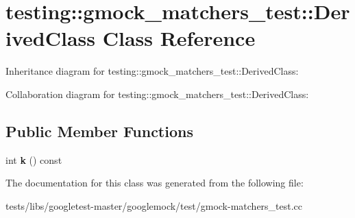 \hypertarget{classtesting_1_1gmock__matchers__test_1_1DerivedClass}{}\section{testing\+:\+:gmock\+\_\+matchers\+\_\+test\+:\+:Derived\+Class Class Reference}
\label{classtesting_1_1gmock__matchers__test_1_1DerivedClass}


Inheritance diagram for testing\+:\+:gmock\+\_\+matchers\+\_\+test\+:\+:Derived\+Class\+:


Collaboration diagram for testing\+:\+:gmock\+\_\+matchers\+\_\+test\+:\+:Derived\+Class\+:
\subsection*{Public Member Functions}
\begin{DoxyCompactItemize}
\item 
\mbox{\label{classtesting_1_1gmock__matchers__test_1_1DerivedClass_a6f8638915c84cb14365e337d99857847}} 
int {\bfseries k} () const
\end{DoxyCompactItemize}


The documentation for this class was generated from the following file\+:\begin{DoxyCompactItemize}
\item 
tests/libs/googletest-\/master/googlemock/test/gmock-\/matchers\+\_\+test.\+cc\end{DoxyCompactItemize}
